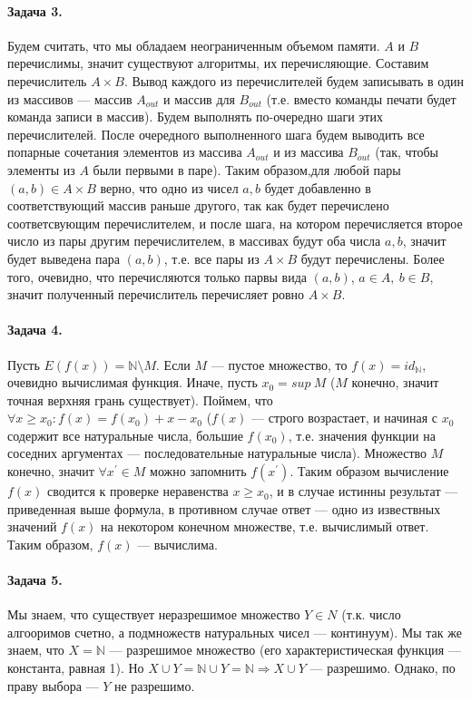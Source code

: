 \documentclass{article}
\newcommand{\pr}{^{\prime}}
\newcommand{\N}{\mathbb{N}}
\begin{document}
    \paragraph{Задача 3.} Будем считать, что мы обладаем неограниченным объемом памяти. $A$ и $B$ перечислимы, значит существуют алгоритмы, их перечисляющие. Составим перечислитель $A\times B$. Вывод каждого из перечислителей будем записывать в один из массивов --- массив $A_{out}$ и массив для $B_{out}$ (т.е. вместо команды печати будет команда записи в массив). Будем выполнять по-очередно шаги этих перечислителей. После очередного выполненного шага будем выводить все попарные сочетания элементов из массива $A_{out}$ и из массива $B_{out}$ (так, чтобы элементы из $A$ были первыми в паре). Таким образом,для любой пары $(a, b) \in A \times B$ верно, что одно из чисел $a, b$ будет добавленно в соответствующий массив раньше другого, так как будет перечислено соответсвующим перечислителем, и после шага, на котором перечисляется второе число из пары другим перечислителем, в массивах будут оба числа $a, b$, значит будет выведена пара $(a, b)$, т.е. все пары из $A \times B$ будут перечислены. Более того, очевидно, что перечисляются только парвы вида $(a, b)$, $a \in A,\ b \in B$, значит полученный перечислитель перечисляет ровно $A \times B$.

    \paragraph{Задача 4.} Пусть $E(f(x)) = \N \setminus M$. Если $M$ --- пустое множество, то $f(x) = id_{\N}$, очевидно вычислимая функция. Иначе, пусть $x_0 = sup\ M$ ($M$ конечно, значит точная верхняя грань существует). Поймем, что $\forall x \ge x_0: f(x) = f(x_0) + x - x_0$ ($f(x)$ --- строго возрастает, и начиная с $x_0$ содержит все натуральные числа, большие $f(x_0)$, т.е. значения функции на соседних аргументах --- последовательные натуральные числа). Множество $M$ конечно, значит $\forall x\pr \in M $ можно запомнить $f(x\pr)$. Таким образом вычисление $f(x)$ сводится к проверке неравенства $x \ge x_0$, и в случае истинны результат --- приведенная выше формула, в противном случае ответ --- одно из извествных значений $f(x)$ на некотором конечном множестве, т.е. вычислимый ответ. Таким образом, $f(x)$ --- вычислима.

    \paragraph{Задача 5.} Мы знаем, что существует неразрешимое множество $Y \in N$ (т.к. число алгооримов счетно, а подмножеств натуральных чисел --- континуум). Мы так же знаем, что $X = \N$ --- разрешимое множество (его характеристическая функция --- константа, равная 1). Но $X \cup Y = \N \cup Y = \N \Rightarrow X \cup Y$ --- разрешимо. Однако, по праву выбора --- $Y$ не разрешимо.
\end{document}
